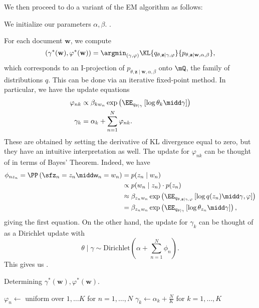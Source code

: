 We then proceed to do a variant of the EM algorithm as follows:
\begin{enumerate}
    \ii We initialize our parameters $\alpha, \beta$.
    \ii
    .

    For each document $\mathbf{w}$, we compute
    \[
    (\gamma^*(\mathbf{w}), \varphi^*(\mathbf{w})) = \argmin_{(\gamma, \varphi)} \KL{q_{\theta, \mathbf{z} \mid \gamma, \varphi}}{p_{\theta, \mathbf{z} \mid \mathbf{w}, \alpha, \beta}},
    \]
    which corresponds to an I-projection of ${p_{\theta, \mathbf{z} \mid \mathbf{w}, \alpha, \beta}}$ onto $\mQ$, the family of distributions $q$.
    This can be done via an iterative fixed-point method. In particular, we have the update equations
    \begin{align*}
        \varphi_{nk} &\propto \beta_{kw_n}\exp\left( \EE_{q_{\theta\mid \gamma}}\left[\log \theta_{k} \midd \gamma\right] \right)\\
        \gamma_k &= \alpha_k + \sum\limits_{n=1}^{N} \varphi_{nk}.
    \end{align*}
    These are obtained by setting the derivative of KL divergence equal to zero, but they have an intuitive interpretation as well. The update for $\varphi_{nk}$ can be thought of in terms of Bayes' Theorem. Indeed, we have
    \begin{align*}
        \phi_{nz_n} = \PP\left( \sfz_n = z_n \midd \mathsf{w}_n = w_n \right)
        &= p(z_n \mid w_n)\\
        &\propto p(w_n \mid z_n) \cdot p(z_n) \\
        &\approx \beta_{z_nw_n} \exp\left( \EE_{q_{\theta, \mathbf{z} \mid \gamma, \varphi}}\left[ \log q(z_n) \midd \gamma, \varphi \right] \right)\\
        &= \beta_{z_nw_n} \exp\left( \EE_{q_{\theta \mid \gamma}}\left[ \log \theta_{z_n} \midd \gamma \right] \right),
    \end{align*}
    giving the first equation. On the other hand, the update for $\gamma_k$ can be thought of as a Dirichlet update with
    \[
    \theta \mid \gamma \sim \text{Dirichlet}\left( \alpha + \sum\limits_{n=1}^{N} \phi_n \right).
    \]
    This gives us .
    
    \begin{algorithm}
        \caption{Determining $\gamma^*(\mathbf{w}), \varphi^*(\mathbf{w})$.}
    \begin{algorithmic} 
        \STATE $\varphi_{n} \leftarrow $ uniform over $1, \ldots K$ for $n = 1, \ldots, N$
        \STATE $\gamma_k \leftarrow \alpha_k + \frac{N}{K}$ for $k = 1, \ldots, K$
        \REPEAT 


\end{algorithmic}
\end{algorithm}
\end{enumerate}
